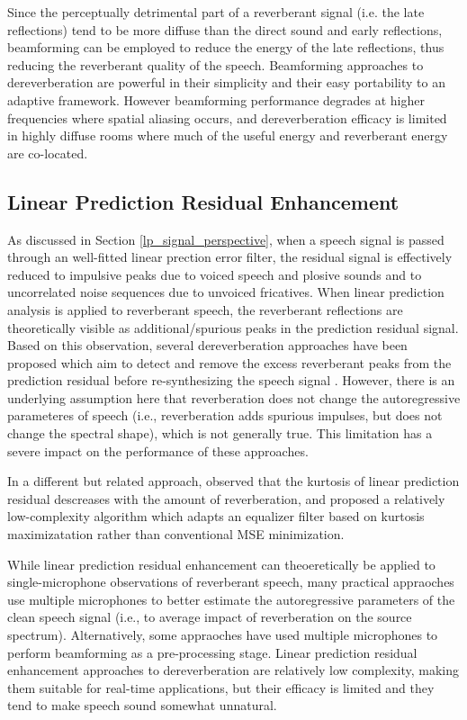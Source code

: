 Since the perceptually detrimental part of a reverberant signal (i.e. the late reflections) tend to be more diffuse than the direct sound and early reflections, beamforming can be employed to reduce the energy of the late reflections, thus reducing the reverberant quality of the speech. Beamforming approaches to dereverberation are powerful in their simplicity and their easy portability to an adaptive framework. However beamforming performance degrades at higher frequencies where spatial aliasing occurs, and dereverberation efficacy is limited in highly diffuse rooms where much of the useful energy and reverberant energy are co-located.


\subsection{Linear Prediction Residual Enhancement}

As discussed in Section \ref{lp_signal_perspective}, when a speech signal is passed through an well-fitted linear prection error filter, the residual signal is effectively reduced to impulsive peaks due to voiced speech and plosive sounds and to uncorrelated noise sequences due to unvoiced fricatives. When linear prediction analysis is applied to reverberant speech, the reverberant reflections are theoretically visible as additional/spurious peaks in the prediction residual signal. Based on this observation, several dereverberation approaches have been proposed which aim to detect and remove the excess reverberant peaks from the prediction residual before re-synthesizing the speech signal \citep{yegnanarayana2002enhancement, thomas2007practical}.  However, there is an underlying assumption here that reverberation does not change the autoregressive parameteres of speech (i.e., reverberation adds spurious impulses, but does not change the spectral shape), which is not generally true. This limitation has a severe impact on the performance of these approaches. 

In a different but related approach, \cite{gillespie2001speech} observed that the kurtosis of linear prediction residual descreases with the amount of reverberation, and proposed a relatively low-complexity algorithm which adapts an equalizer filter based on kurtosis maximizatation rather than conventional MSE minimization.

While linear prediction residual enhancement can theoeretically be applied to single-microphone observations of reverberant speech, many practical appraoches use multiple microphones to better estimate the autoregressive parameters of the clean speech signal (i.e., to average impact of reverberation on the source spectrum). Alternatively, some appraoches have used multiple microphones to perform beamforming as a pre-processing stage. Linear prediction residual enhancement approaches to dereverberation are relatively low complexity, making them suitable for real-time applications, but their efficacy is limited and they tend to make speech sound somewhat unnatural. 

